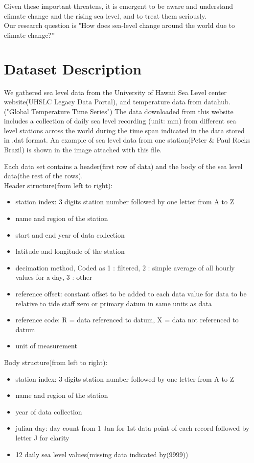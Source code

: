 \documentclass[fontsize=11pt]{article}
\begin{document}
    Given these important threatens, it is emergent to be aware and understand climate change and the rising sea level, and to treat them seriously.\\

    Our research question is "How does sea-level change around the world due to climate change?”

    \newpage
    \section*{Dataset Description}
    We gathered sea level data from the University of Hawaii Sea Level center website(UHSLC Legacy Data Portal), and temperature data from datahub. ("Global Temperature Time Series") The data downloaded from this website includes a collection of daily sea level recording (unit: mm) from different sea level stations across the world during the time span indicated in the data stored in .dat format. An example of sea level data from one station(Peter \& Paul Rocks Brazil) is shown in the image attached with this file.

    Each data set contains a header(first row of data) and the body of the sea level data(the rest of the rows).\\

    Header structure(from left to right):
    \begin{itemize}
        \item
        station index: 3 digits station number followed by one letter from A to Z
        \item
        name and region of the station
        \item
        start and end year of data collection
        \item
        latitude and longitude of the station
        \item
        decimation method, Coded as
        1 : filtered,
        2 : simple average of all hourly values for a day,
        3 : other
        \item
        reference offset: constant offset to be added to each data value for data to be relative to tide staff zero or primary datum in same units as data
        \item
        reference code: R = data referenced to datum,
        X = data not referenced to datum
        \item
        unit of measurement
    \end{itemize}

    Body structure(from left to right):
    \begin{itemize}
        \item
        station index: 3 digits station number followed by one letter from A to Z
        \item
        name and region of the station
        \item
        year of data collection
        \item
        julian day: day count from 1 Jan for 1st data point of each record followed by letter J for clarity
        \item
        12 daily sea level values(missing data indicated by(9999))
    \end{itemize}
\end{document}
